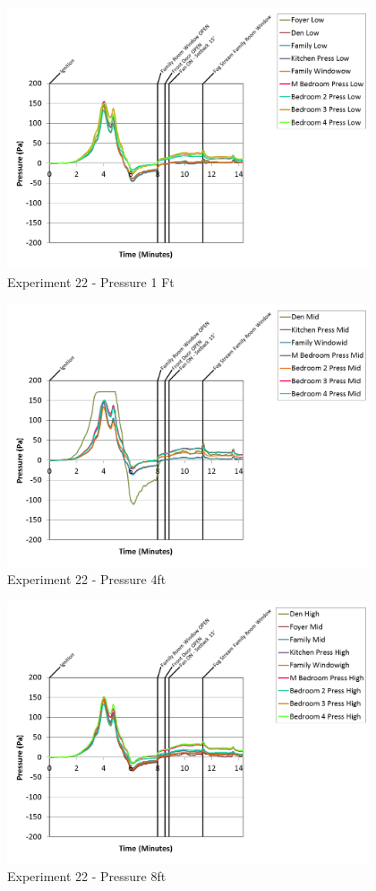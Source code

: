 \documentclass{article}
\begin{document}
\begin{appendices}
\clearpage

\begin{figure}[h!]
	\centering
	\includegraphics[height=3.05in]{0_Images/Results_Charts/Exp_22_Charts/Pressure1Ft.png}
	\caption{Experiment 22 - Pressure 1 Ft}
\end{figure}


\begin{figure}[h!]
	\centering
	\includegraphics[height=3.05in]{0_Images/Results_Charts/Exp_22_Charts/Pressure4ft.png}
	\caption{Experiment 22 - Pressure 4ft}
\end{figure}

\clearpage

\begin{figure}[h!]
	\centering
	\includegraphics[height=3.05in]{0_Images/Results_Charts/Exp_22_Charts/Pressure8ft.png}
	\caption{Experiment 22 - Pressure 8ft}
\end{figure}



\end{appendices}
\end{document}
